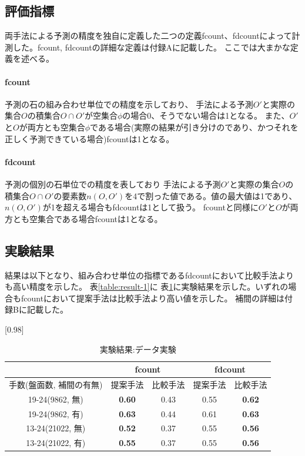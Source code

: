 \subsection{評価指標}
両手法による予測の精度を独自に定義した二つの定義fcount、fdcountによって計測した。fcount, fdcountの詳細な定義は付録Aに記載した。
ここでは大まかな定義を述べる。
\paragraph{fcount}
予測の石の組み合わせ単位での精度を示しており、
手法による予測$O'$と実際の集合$O$の積集合$O\cap O'$が空集合$\phi$の場合0、そうでない場合は1となる。
また、$O'$と$O$が両方とも空集合$\phi$である場合(実際の結果が引き分けのであり、かつそれを正しく予測できている場合)fcountは1となる。
\paragraph{fdcount}
予測の個別の石単位での精度を表しており
手法による予測$O'$と実際の集合$O$の積集合$O\cap O'$の要素数$n(O, O')$を4で割った値である。値の最大値は1であり、$n(O, O')$が1を超える場合もfdcountは1として扱う。
fcountと同様に$O'$と$O$が両方とも空集合である場合fcountは1となる。
\subsection{実験結果}
結果は以下となり、組み合わせ単位の指標であるfdcountにおいて比較手法よりも高い精度を示した。
表\ref{table:result-1}に
表\ref{table:result-online}に実験結果を示した。いずれの場合もfcountにおいて提案手法は比較手法より高い値を示した。
補間の詳細は付録Bに記載した。
\begin{table}[H]
	\caption{実験結果:データ実験}
	\centering
	\scalebox{0.98}[0.98]{
		\begin{tabular}{c|c|c|c|c}
			\multicolumn{1}{c}{} & \multicolumn{2}{|c|}{fcount} 
			& \multicolumn{2}{c|}{fdcount}\\ \hline \hline
			手数(盤面数, 補間の有無)    & 提案手法 & 比較手法 & 提案手法 & 比較手法 \\ \hline
			19-24(9862, 無)    & \bf{0.60} & 0.43 & 0.55 & \bf{0.62} \\
			19-24(9862, 有)    & \bf{0.63} & 0.44 & 0.61 & \bf{0.63}  \\
			13-24(21022, 無)   & \bf{0.52} & 0.37 & 0.55 & \bf{0.56}  \\
			13-24(21022, 有)   & \bf{0.55} & 0.37 & 0.55 & \bf{0.56}  \\
		\end{tabular}
	}
	\label{table:result-online}
\end{table}
